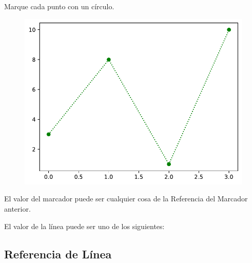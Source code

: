 \begin{code} Marque cada punto con un círculo.

\begin{Shaded}
\begin{Highlighting}[]

\OperatorTok{=}\NormalTok{ np.array([}\NormalTok{, }\NormalTok{, }\NormalTok{, }\NormalTok{])}

\NormalTok{)}
\end{Highlighting}
\end{Shaded}

\begin{figure}
  \centering
  \includegraphics[scale=0.6]{img/grafica1009.pdf}
\end{figure}

\end{code}

El valor del marcador puede ser cualquier cosa de la Referencia del
Marcador anterior.

El valor de la línea puede ser uno de los siguientes:

\subsection{Referencia de Línea}

